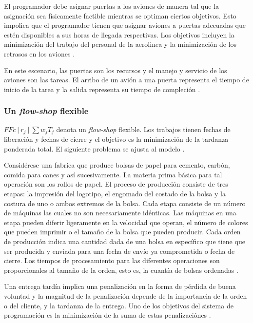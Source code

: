 \documentclass[spanish,draft,12pt,headsepline,footsepline,paper=letter]{scrreprt}
\newenvironment{simple}{\setlength{\parindent}{0pt}}{}
\begin{document}
El programador debe asignar puertas a los aviones de manera tal que la asignación sea físicamente factible mientras se optiman ciertos objetivos. Esto impolica que el programador tienen que asignar aviones a puertas adecuadas que estén disponibles a sus horas de llegada respectivas. Los objetivos incluyen la minimización del trabajo del personal de la aerolinea y la minimización de los retrasos en los aviones \citep[p.~3]{Pinedo1995}.

En este escenario, las puertas son los recursos y el manejo y servicio de los aviones son las tareas. El arribo de un avión a una puerta representa el tiempo de inicio de la tarea y la salida representa su tiempo de compleción \citep[p.~3]{Pinedo1995}.

\subsubsection{Un \textit{flow-shop} flexible}

\begin{simple}
  $FFc \: \lvert \: r_j \: \lvert \: \sum w_jT_j$ denota un \textit{flow-shop} flexible. Los trabajos tienen fechas de liberación y fechas de cierre y el objetivo es la minimización de la tardanza ponderada total. El siguiente problema se ajusta al modelo \citep[p.~20]{Pinedo1995}.
\end{simple}

Considérese una fabrica que produce bolsas de papel para cemento, carbón, comida para canes y así sucesivamente. La materia prima básica para tal operación son los rollos de papel. El proceso de producción consiste de tres etapas: la impresión del logotipo, el engomado del costado de la bolsa y la costura de uno o ambos extremos de la bolsa. Cada etapa consiste de un número de máquinas las cuales no son necesariamente idénticas. Las máquinas en una etapa pueden diferir ligeramente en la velocidad que operan, el número de colores que pueden imprimir o el tamaño de la bolsa que pueden producir. Cada orden de producción indica una cantidad dada de una bolsa en específico que tiene que ser producida y enviada para una fecha de envío ya comprometida o fecha de cierre. Los tiempos de procesamiento para las diferentes operaciones son proporcionales al tamaño de la orden, esto es, la cuantía de bolsas ordenadas \citep[p.~1,~2]{Pinedo1995}.

Una entrega tardía implica una penalización en la forma de pérdida de buena voluntad y la magnitud de la penalización depende de la importancia de la orden o del cliente, y la tardanza de la entrega. Uno de los objetivos del sistema de programación es la minimización de la suma de estas penalizaciónes \citep[p.~2]{Pinedo1995}.
\end{document}
